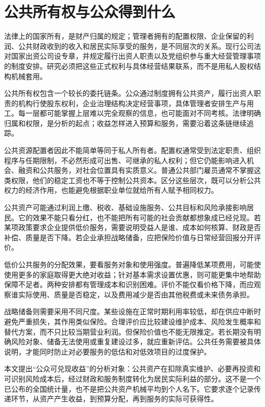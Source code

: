 \documentclass[UTF8,fontset=fandol,zihao=-4,oneside,openany]{ctexbook}
\begin{document}
\section{公共所有权与公众得到什么}
法律上的国家所有，是财产归属的规定；管理者拥有的配置权限、企业保留的利润、公共财政收到的收入和居民实际享受的服务，是不同层次的关系。现行公司法对国家出资公司设专章，并规定履行出资人职责以及党组织参与重大经营管理事项的制度安排。研究必须把这些正式权利与具体经营结果联系，而不是用私人股权结构机械套用。\cite{CompanyLaw}

\label{arg:P024}
公共所有权包含一个较长的委托链条。公众通过制度拥有公共资产，履行出资人职责的机构行使股东权利，企业治理结构决定经营事项，具体管理者安排生产与用工。每一层都可能掌握上层难以完全观察的信息，也可能面对不同考核。法律明确归属和权限，是分析的起点；收益怎样进入预算和服务，需要沿着这条链继续追踪。

公共资源配置者因此不能简单等同于私人所有者。配置权通常受到法定职责、组织程序与任期限制，不必然形成可出售、可继承的私人权利；但它仍能影响进入机会、融资和公共服务，对社会位置具有实质意义。普通公共部门雇员通常不掌握这类权限，他们的稳定工资也不等于控制公共资本。区分这些层次，既可以分析公共权力的经济作用，也能避免根据职业单位就给所有人赋予相同权力。

公共资产可能通过利润上缴、税收、基础设施服务、公共目标和风险承接影响居民。它的效果不能只看分红，也不能把所有可能的社会贡献都想象成已经兑现。若某项政策要求企业提供低价服务，需要说明受益人是谁、成本如何核算、财政是否补偿、质量是否下降。若企业承担战略储备，应把保险价值与日常经营回报分开评价。

\label{arg:P025}
低价公共服务的分配效果，要看服务对象和使用强度。普遍降低某项费用，可能使使用更多的家庭取得更大绝对收益；针对基本需求设置优惠，则可能更集中地帮助保障不足者。两种安排都有管理成本和识别困难。评价不能仅看价格下降，而应观察谁实际使用、质量是否稳定，以及费用减少是否由其他税费或未来债务承担。

战略储备则需要采用不同尺度。某些设施在正常时期利用率较低，却在供应中断时避免严重损失，其作用类似保险。合理评价应比较建设维护成本、风险发生概率和替代方案，而不只比较当期营业利润。但保险价值也不能无限推定。若长期没有明确风险对象、储备无法使用或重复建设过多，就应重新评估。公共任务需要被具体说明，才能同时防止对必要服务的低估和对低效项目的过度保护。

本文提出“公众可兑现收益”的分析对象：公共资产在扣除真实维护、必要再投资和可识别风险成本后，经过财政和服务制度转化为居民实际利益的部分。这不是一个已公布的全国统计量，也不是把公共资产机械平均到个人名下。它要求逐个记录传递环节，从资产产生收益，到预算分配，再到服务的实际可获得性。
\end{document}
